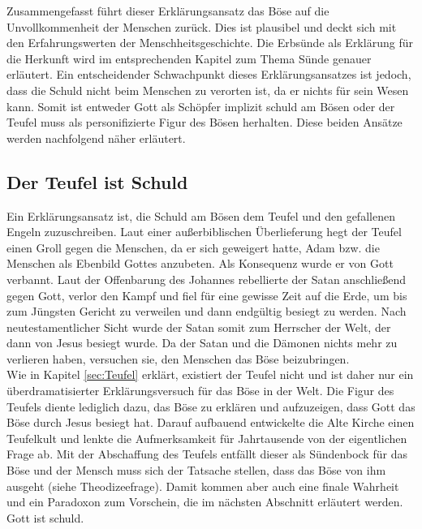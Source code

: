 Zusammengefasst führt dieser Erklärungsansatz das Böse auf die Unvollkommenheit der Menschen zurück. Dies ist plausibel und deckt sich mit den Erfahrungswerten der Menschheitsgeschichte. Die Erbsünde als Erklärung für die Herkunft wird im entsprechenden Kapitel zum Thema Sünde genauer erläutert. Ein entscheidender Schwachpunkt dieses Erklärungsansatzes ist jedoch, dass die Schuld nicht beim Menschen zu verorten ist, da er nichts für sein Wesen kann. Somit ist entweder Gott als Schöpfer implizit schuld am Bösen oder der Teufel muss als personifizierte Figur des Bösen herhalten. Diese beiden Ansätze werden nachfolgend näher erläutert.

\subsection{Der Teufel ist Schuld}
Ein Erklärungsansatz ist, die Schuld am Bösen dem Teufel und den gefallenen Engeln zuzuschreiben. Laut einer außerbiblischen Überlieferung hegt der Teufel einen Groll gegen die Menschen, da er sich geweigert hatte, Adam bzw. die Menschen als Ebenbild Gottes anzubeten. Als Konsequenz wurde er von Gott verbannt. Laut der Offenbarung des Johannes rebellierte der Satan anschließend gegen Gott, verlor den Kampf und fiel für eine gewisse Zeit auf die Erde, um bis zum Jüngsten Gericht zu verweilen und dann endgültig besiegt zu werden. Nach neutestamentlicher Sicht wurde der Satan somit zum Herrscher der Welt, der dann von Jesus besiegt wurde. Da der Satan und die Dämonen nichts mehr zu verlieren haben, versuchen sie, den Menschen das Böse beizubringen. \\

Wie in Kapitel  \ref{sec:Teufel} erklärt, existiert der Teufel nicht und ist daher nur ein überdramatisierter Erklärungsversuch für das Böse in der Welt. Die Figur des Teufels diente lediglich dazu, das Böse zu erklären und aufzuzeigen, dass Gott das Böse durch Jesus besiegt hat. Darauf aufbauend entwickelte die Alte Kirche einen Teufelkult und lenkte die Aufmerksamkeit für Jahrtausende von der eigentlichen Frage ab. Mit der Abschaffung des Teufels entfällt dieser als Sündenbock für das Böse und der Mensch muss sich der Tatsache stellen, dass das Böse von ihm ausgeht (siehe Theodizeefrage). Damit kommen aber auch eine finale Wahrheit und ein Paradoxon zum Vorschein, die im nächsten Abschnitt erläutert werden. Gott ist schuld.

